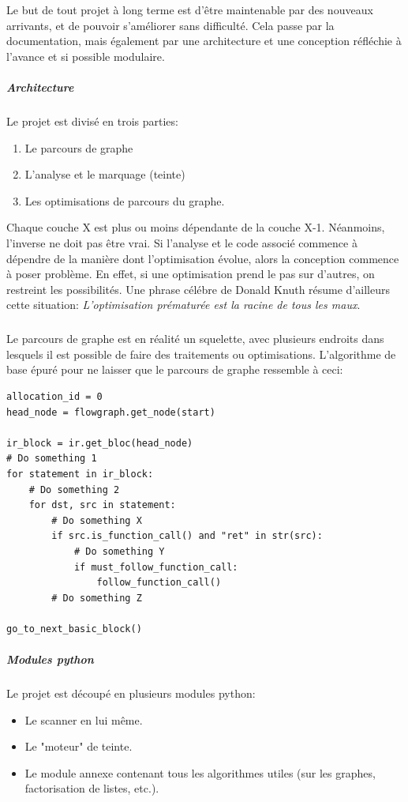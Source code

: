 Le but de tout projet à long terme est d'être maintenable par des nouveaux arrivants, et de pouvoir s'améliorer
sans difficulté. Cela passe par la documentation, mais également par une architecture et une conception réfléchie à l'avance
et si possible modulaire.
\subparagraph{Architecture}
Le projet est divisé en trois parties:
\begin{enumerate}
        \item Le parcours de graphe
        \item L'analyse et le marquage (teinte)
        \item Les optimisations de parcours du graphe.
\end{enumerate}
Chaque couche X est plus ou moins dépendante de la couche X-1. Néanmoins, l'inverse ne doit pas être vrai.
Si l'analyse et le code associé commence à dépendre de la manière dont l'optimisation évolue, alors la conception commence à poser problème.
En effet, si une optimisation prend le pas sur d'autres, on restreint les possibilités. Une phrase célébre de Donald Knuth résume d'ailleurs cette situation:
\textit{L'optimisation prématurée est la racine de tous les maux}.
\subparagraph{}
Le parcours de graphe est en réalité un squelette, avec plusieurs endroits dans lesquels il est possible de faire des traitements ou optimisations. L'algorithme de base
épuré pour ne laisser que le parcours de graphe ressemble à ceci:
\begin {lstlisting}[frame=single]
allocation_id = 0
head_node = flowgraph.get_node(start)

ir_block = ir.get_bloc(head_node)
# Do something 1
for statement in ir_block:
    # Do something 2
    for dst, src in statement:
        # Do something X
        if src.is_function_call() and "ret" in str(src):
            # Do something Y
            if must_follow_function_call:
                follow_function_call()
        # Do something Z

go_to_next_basic_block()
\end{lstlisting}

\subparagraph{Modules python}
Le projet est découpé en plusieurs modules python:
\begin{itemize}
        \item Le scanner en lui même.
        \item Le "moteur" de teinte.
        \item Le module annexe contenant tous les algorithmes utiles (sur les graphes, factorisation de listes, etc.).
\end{itemize}

